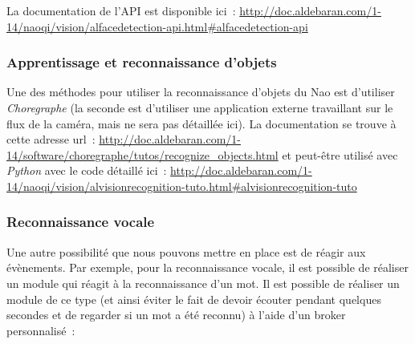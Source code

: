 \documentclass{article}
\begin{document}
La documentation de l'API est disponible ici~:
\url{http://doc.aldebaran.com/1-14/naoqi/vision/alfacedetection-api.html#alfacedetection-api}

\subsubsection{Apprentissage et reconnaissance d'objets}

Une des méthodes pour utiliser la reconnaissance d'objets du Nao est d'utiliser \emph{Choregraphe} (la seconde est d'utiliser une application externe travaillant sur le flux de la caméra, mais ne sera pas détaillée ici).
La documentation se trouve à cette adresse url~: \url{http://doc.aldebaran.com/1-14/software/choregraphe/tutos/recognize_objects.html} et peut-être utilisé avec \emph{Python} avec le code détaillé ici~: \url{http://doc.aldebaran.com/1-14/naoqi/vision/alvisionrecognition-tuto.html#alvisionrecognition-tuto}

\subsubsection{Reconnaissance vocale}
Une autre possibilité que nous pouvons mettre en place est de réagir aux évènements. Par exemple, pour la reconnaissance vocale, il est possible de réaliser un module qui réagit à la reconnaissance d'un mot. Il est possible de réaliser un module de ce type (et ainsi éviter le fait de devoir écouter pendant quelques secondes et de regarder si un mot a été reconnu) à l'aide d'un broker personnalisé~:
\end{document}
